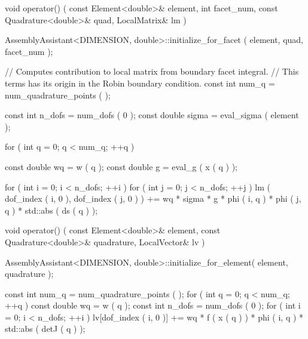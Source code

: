 \documentclass[a4paper, 11pt, twoside]{article}
\begin{document}
		\begin{code}[caption={Computes robin boundary condition.}, label=sc:robin]
    void operator() ( const Element<double>& element, 
                      int facet_num, 
                      const Quadrature<double>& quad, 
                      LocalMatrix& lm )
    {
        AssemblyAssistant<DIMENSION, double>::initialize_for_facet ( element, 
                                                                     quad, 
                                                                     facet_num );

        // Computes contribution to local matrix from boundary facet integral.
        // This terms has its origin in the Robin boundary condition.
        const int num_q = num_quadrature_points ( );

        const int n_dofs = num_dofs ( 0 );
        const double sigma = eval_sigma ( element );

        for ( int q = 0; q < num_q; ++q )
        {
            const double wq = w ( q );
            const double g = eval_g ( x ( q ) );

            for ( int i = 0; i < n_dofs; ++i )
            {
                for ( int j = 0; j < n_dofs; ++j )
                {
                    lm ( dof_index ( i, 0 ), dof_index ( j, 0 ) ) +=
                            wq * sigma * g * phi ( i, q ) * phi ( j, q ) * 
                            std::abs ( ds ( q ) );
                }
            }
        }
    }
	\end{code}
	\begin{code}[caption={Computes right hand side, see \eqref{eq:finiteelement2}.}, label=sc:rhs]
    void operator() ( const Element<double>& element, 
                      const Quadrature<double>& quadrature,
                      LocalVector& lv )
    {
        AssemblyAssistant<DIMENSION, double>::initialize_for_element( element, 
                                                                      quadrature );

        const int num_q = num_quadrature_points ( );
        for ( int q = 0; q < num_q; ++q )
        {
            const double wq = w ( q );
            const int n_dofs = num_dofs ( 0 );
            for ( int i = 0; i < n_dofs; ++i )
            {
                lv[dof_index ( i, 0 )] += wq * f ( x ( q ) ) * phi ( i, q ) * 
                              std::abs ( detJ ( q ) );
            }
        }
    }
  \end{code}
\end{document}
